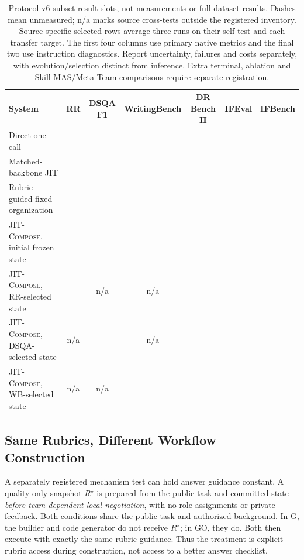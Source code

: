\documentclass[11pt]{article}
\newcommand{\method}{\mbox{\textsc{JIT-Compose}}}
\newcommand{\na}{\textemdash}
\begin{document}
\begin{table}[t]
\centering\small
\begin{tabularx}{\textwidth}{@{}Xcccccc@{}}
\toprule
System & RR & DSQA F1 & WritingBench & DR Bench II & IFEval & IFBench \\
\midrule
Direct one-call & \na & \na & \na & \na & \na & \na \\
Matched-backbone JIT & \na & \na & \na & \na & \na & \na \\
Rubric-guided fixed organization & \na & \na & \na & \na & \na & \na \\
\method, initial frozen state & \na & \na & \na & \na & \na & \na \\
\method, RR-selected state & \na & n/a & n/a & \na & \na & \na \\
\method, DSQA-selected state & n/a & \na & n/a & \na & \na & \na \\
\method, WB-selected state & n/a & n/a & \na & \na & \na & \na \\
\bottomrule
\end{tabularx}
\caption{Protocol v6 subset result slots, not measurements or full-dataset results. Dashes mean unmeasured; n/a marks source cross-tests outside the registered inventory. Source-specific selected rows average three runs on their self-test and each transfer target. The first four columns use primary native metrics and the final two use instruction diagnostics. Report uncertainty, failures and costs separately, with evolution/selection distinct from inference. Extra terminal, ablation and Skill-MAS/Meta-Team comparisons require separate registration.}
\label{tab:main}
\end{table}

\subsection{Same Rubrics, Different Workflow Construction}
\label{sec:guidance}

A separately registered mechanism test can hold answer guidance constant. A quality-only snapshot $R^{\star}$ is prepared from the public task and committed state \emph{before team-dependent local negotiation}, with no role assignments or private feedback. Both conditions share the public task and authorized background. In G, the builder and code generator do not receive $R^{\star}$; in GO, they do. Both then execute with exactly the same rubric guidance. Thus the treatment is explicit rubric access during construction, not access to a better answer checklist.
\end{document}
